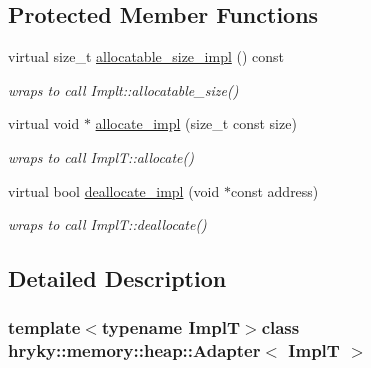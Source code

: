 \subsection*{Protected Member Functions}
\begin{DoxyCompactItemize}
\item 
\hypertarget{classhryky_1_1memory_1_1heap_1_1_adapter_ab42aed85df5a090c225eae420252ba3d}{virtual size\-\_\-t \hyperlink{classhryky_1_1memory_1_1heap_1_1_adapter_ab42aed85df5a090c225eae420252ba3d}{allocatable\-\_\-size\-\_\-impl} () const }\label{classhryky_1_1memory_1_1heap_1_1_adapter_ab42aed85df5a090c225eae420252ba3d}

\begin{DoxyCompactList}\small\item\em wraps to call Implt\-::allocatable\-\_\-size() \end{DoxyCompactList}\item 
\hypertarget{classhryky_1_1memory_1_1heap_1_1_adapter_a630650b1be0542f99c920da0f34aa6e4}{virtual void $\ast$ \hyperlink{classhryky_1_1memory_1_1heap_1_1_adapter_a630650b1be0542f99c920da0f34aa6e4}{allocate\-\_\-impl} (size\-\_\-t const size)}\label{classhryky_1_1memory_1_1heap_1_1_adapter_a630650b1be0542f99c920da0f34aa6e4}

\begin{DoxyCompactList}\small\item\em wraps to call Impl\-T\-::allocate() \end{DoxyCompactList}\item 
\hypertarget{classhryky_1_1memory_1_1heap_1_1_adapter_a9f41a74072b1ed33925ed6d30d077cb0}{virtual bool \hyperlink{classhryky_1_1memory_1_1heap_1_1_adapter_a9f41a74072b1ed33925ed6d30d077cb0}{deallocate\-\_\-impl} (void $\ast$const address)}\label{classhryky_1_1memory_1_1heap_1_1_adapter_a9f41a74072b1ed33925ed6d30d077cb0}

\begin{DoxyCompactList}\small\item\em wraps to call Impl\-T\-::deallocate() \end{DoxyCompactList}\end{DoxyCompactItemize}


\subsection{Detailed Description}
\subsubsection*{template$<$typename Impl\-T$>$class hryky\-::memory\-::heap\-::\-Adapter$<$ Impl\-T $>$}

